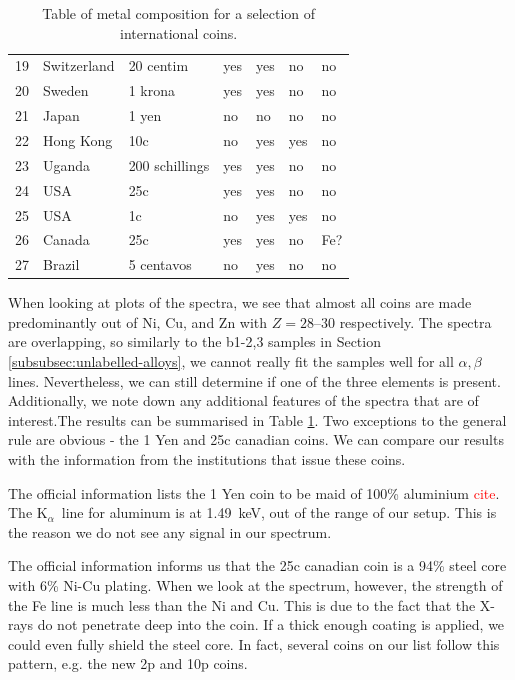 \documentclass[11pt,a4paper,twoside,onecolumn]{article}
\newcommand{\reminder}[1]{\textcolor{red}{#1}}
\newcommand{\Kalpha}{$\mathrm{K}_\alpha$~}
\begin{document}
\begin{table}[!htbp]
\begin{tabular}{@{}lllllll@{}}
    19 & Switzerland    & 20 centim      & yes & yes & no  & no    \\
    20 & Sweden         & 1 krona        & yes & yes & no  & no    \\
    21 & Japan          & 1 yen          & no  & no  & no  & no    \\
    22 & Hong Kong      & 10c            & no  & yes & yes & no    \\
    23 & Uganda         & 200 schillings & yes & yes & no  & no    \\
    24 & USA            & 25c            & yes & yes & no  & no    \\
    25 & USA            & 1c             & no  & yes & yes & no    \\
    26 & Canada         & 25c            & yes & yes & no  & Fe?   \\
    27 & Brazil         & 5 centavos     & no  & yes & no  & no    \\ \bottomrule
    \end{tabular}
    \caption{Table of metal composition for a selection of international coins.}
    \label{tab:coin-measured}
\end{table}

When looking at plots of the spectra, we see that almost all coins are made predominantly out of Ni, Cu, and Zn with $Z=\numrange{28}{30}$ respectively. The spectra are overlapping, so similarly to the b1-2,3 samples in Section \ref{subsubsec:unlabelled-alloys}, we cannot really fit the samples well for all $\alpha, \beta$ lines. Nevertheless, we can still determine if one of the three elements is present. Additionally, we note down any additional features of the spectra that are of interest.The results can be summarised in Table \ref{tab:coin-measured}. Two exceptions to the general rule are obvious - the 1 Yen and 25c canadian coins. We can compare our results with the information from the institutions that issue these coins.

The official information lists the 1 Yen coin to be maid of 100\% aluminium \reminder{cite}. The \Kalpha line for aluminum is at \qty{1.49}{keV}, out of the range of our setup. This is the reason we do not see any signal in our spectrum.

The official information informs us that the 25c canadian coin is a 94\% steel core with 6\% Ni-Cu plating. When we look at the spectrum, however, the strength of the Fe line is much less than the Ni and Cu. This is due to the fact that the X-rays do not penetrate deep into the coin. If a thick enough coating is applied, we could even fully shield the steel core. In fact, several coins on our list follow this pattern, e.g. the new 2p and 10p coins.
\end{document}
